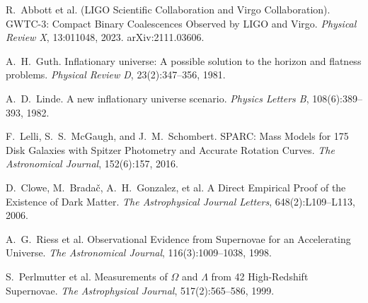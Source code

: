 \documentclass[11pt,a4paper]{article}
\numberwithin{equation}{section}
\theoremstyle{plain}
\theoremstyle{definition}
\theoremstyle{remark}
\begin{document}
\begin{thebibliography}{99}
R.~Abbott et al. (LIGO Scientific Collaboration and Virgo Collaboration).
\newblock GWTC-3: Compact Binary Coalescences Observed by LIGO and Virgo.
\newblock \emph{Physical Review X}, 13:011048, 2023. arXiv:2111.03606.

A.~H.~Guth.
\newblock Inflationary universe: A possible solution to the horizon and flatness problems.
\newblock \emph{Physical Review D}, 23(2):347--356, 1981.

A.~D.~Linde.
\newblock A new inflationary universe scenario.
\newblock \emph{Physics Letters B}, 108(6):389--393, 1982.

F.~Lelli, S.~S.~McGaugh, and J.~M.~Schombert.
\newblock SPARC: Mass Models for 175 Disk Galaxies with Spitzer Photometry and Accurate Rotation Curves.
\newblock \emph{The Astronomical Journal}, 152(6):157, 2016.

D.~Clowe, M.~Bradač, A.~H.~Gonzalez, et al.
\newblock A Direct Empirical Proof of the Existence of Dark Matter.
\newblock \emph{The Astrophysical Journal Letters}, 648(2):L109--L113, 2006.

A.~G.~Riess et al.
\newblock Observational Evidence from Supernovae for an Accelerating Universe.
\newblock \emph{The Astronomical Journal}, 116(3):1009--1038, 1998.

S.~Perlmutter et al.
\newblock Measurements of $\Omega$ and $\Lambda$ from 42 High-Redshift Supernovae.
\newblock \emph{The Astrophysical Journal}, 517(2):565--586, 1999.

\end{thebibliography}

\end{document}
